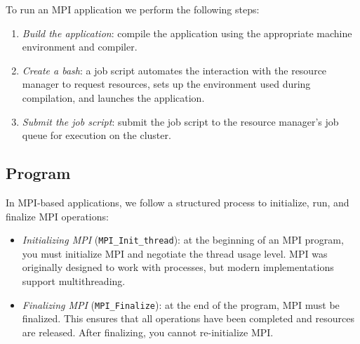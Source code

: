 To run an MPI application we perform the following steps: 
\begin{enumerate}
    \item \textit{Build the application}: compile the application using the appropriate machine environment and compiler.
    \item \textit{Create a bash}: a job script automates the interaction with the resource manager to request resources, sets up the environment used during compilation, and launches the application.
    \item \textit{Submit the job script}: submit the job script to the resource manager's job queue for execution on the cluster.
\end{enumerate}

\subsection{Program}
In MPI-based applications, we follow a structured process to initialize, run, and finalize MPI operations: 
\begin{itemize}
    \item \textit{Initializing MPI} (\texttt{MPI\_Init\_thread}): at the beginning of an MPI program, you must initialize MPI and negotiate the thread usage level. 
        MPI was originally designed to work with processes, but modern implementations support multithreading.
    \item \textit{Finalizing MPI} (\texttt{MPI\_Finalize}): at the end of the program, MPI must be finalized. 
        This ensures that all operations have been completed and resources are released. 
        After finalizing, you cannot re-initialize MPI.
\end{itemize}

